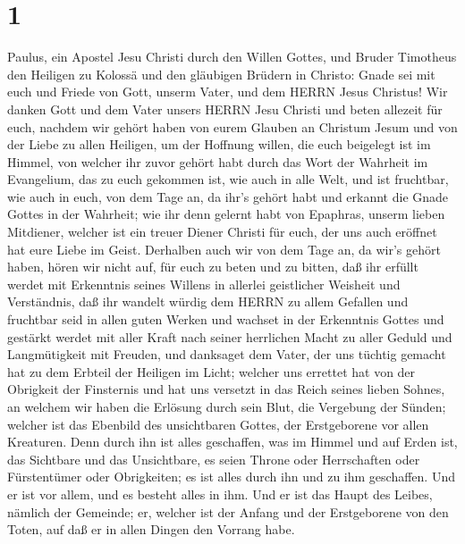 \hypertarget{section}{%
\section{1}\label{section}}

 Paulus, ein Apostel Jesu Christi durch den Willen Gottes,
und Bruder Timotheus  den Heiligen zu Kolossä und den
gläubigen Brüdern in Christo: Gnade sei mit euch und Friede von Gott,
unserm Vater, und dem HERRN Jesus Christus!  Wir danken Gott
und dem Vater unsers HERRN Jesu Christi und beten allezeit für euch,
 nachdem wir gehört haben von eurem Glauben an Christum
Jesum und von der Liebe zu allen Heiligen,  um der Hoffnung
willen, die euch beigelegt ist im Himmel, von welcher ihr zuvor gehört
habt durch das Wort der Wahrheit im Evangelium,  das zu euch
gekommen ist, wie auch in alle Welt, und ist fruchtbar, wie auch in
euch, von dem Tage an, da ihr's gehört habt und erkannt die Gnade Gottes
in der Wahrheit;  wie ihr denn gelernt habt von Epaphras,
unserm lieben Mitdiener, welcher ist ein treuer Diener Christi für euch,
 der uns auch eröffnet hat eure Liebe im Geist. 
Derhalben auch wir von dem Tage an, da wir's gehört haben, hören wir
nicht auf, für euch zu beten und zu bitten, daß ihr erfüllt werdet mit
Erkenntnis seines Willens in allerlei geistlicher Weisheit und
Verständnis,  daß ihr wandelt würdig dem HERRN zu allem
Gefallen und fruchtbar seid in allen guten Werken  und
wachset in der Erkenntnis Gottes und gestärkt werdet mit aller Kraft
nach seiner herrlichen Macht zu aller Geduld und Langmütigkeit mit
Freuden,  und danksaget dem Vater, der uns tüchtig gemacht
hat zu dem Erbteil der Heiligen im Licht;  welcher uns
errettet hat von der Obrigkeit der Finsternis und hat uns versetzt in
das Reich seines lieben Sohnes,  an welchem wir haben die
Erlösung durch sein Blut, die Vergebung der Sünden; 
welcher ist das Ebenbild des unsichtbaren Gottes, der Erstgeborene vor
allen Kreaturen.  Denn durch ihn ist alles geschaffen, was
im Himmel und auf Erden ist, das Sichtbare und das Unsichtbare, es seien
Throne oder Herrschaften oder Fürstentümer oder Obrigkeiten; es ist
alles durch ihn und zu ihm geschaffen.  Und er ist vor
allem, und es besteht alles in ihm.  Und er ist das Haupt
des Leibes, nämlich der Gemeinde; er, welcher ist der Anfang und der
Erstgeborene von den Toten, auf daß er in allen Dingen den Vorrang habe.
